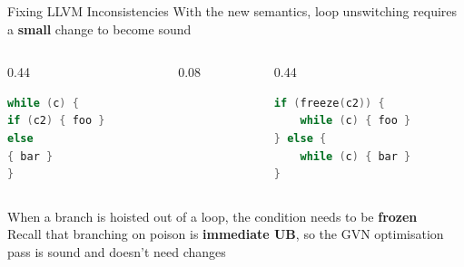\begin{frame}[fragile]{Fixing LLVM Inconsistencies}
  With the new semantics, loop unswitching requires a \textbf{small} change to become sound
    \begin{columns}[c]
        \begin{column}{0.44\textwidth}
            \begin{lstlisting}[language=C++, frame=single, xleftmargin=4pt, xrightmargin=4pt]
while (c) {
if (c2) { foo }
else
{ bar }
}
            \end{lstlisting}
        \end{column}
        \begin{column}{0.08\textwidth}
            \transform
        \end{column}
        \begin{column}{0.44\textwidth}
            \begin{lstlisting}[language=C++, frame=single, xleftmargin=4pt, xrightmargin=4pt]
if (freeze(c2)) {
    while (c) { foo }
} else {
    while (c) { bar }
}
            \end{lstlisting}
        \end{column}
    \end{columns}
When a branch is hoisted out of a loop, the condition needs to be \textbf{frozen}\\
\vspace{1.5em}
Recall that branching on poison is \textbf{immediate UB}, so the GVN optimisation pass is sound and doesn't need changes 


\end{frame}
